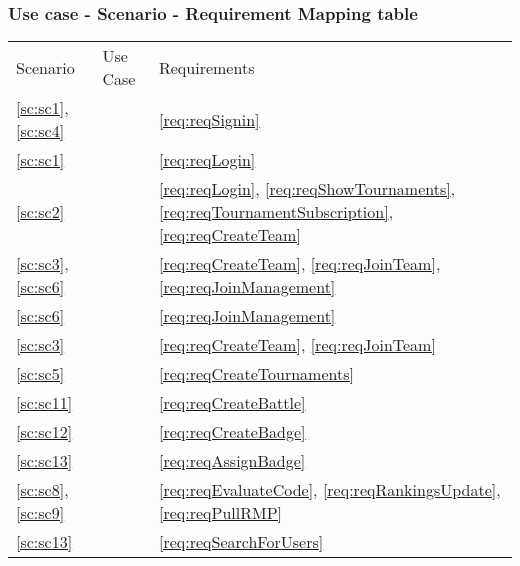 \subsubsection{Use case - Scenario - Requirement Mapping table}
\begin{center}
    \begin{tabu}{|X[.2]|X[.6]|X[.2]|} \hline \everyrow{\hline}
        Scenario & Use Case & Requirements \\
        \ref{sc:sc1}, \ref{sc:sc4} &  & \ref{req:reqSignin} \\
        \ref{sc:sc1} &  & \ref{req:reqLogin} \\
        \ref{sc:sc2} &  & \ref{req:reqLogin}, \ref{req:reqShowTournaments}, \ref{req:reqTournamentSubscription}, \ref{req:reqCreateTeam}\\
        \ref{sc:sc3}, \ref{sc:sc6} &  & \ref{req:reqCreateTeam}, \ref{req:reqJoinTeam}, \ref{req:reqJoinManagement} \\
        \ref{sc:sc6} &  & \ref{req:reqJoinManagement} \\
        \ref{sc:sc3} &  & \ref{req:reqCreateTeam}, \ref{req:reqJoinTeam} \\
        \ref{sc:sc5} &  & \ref{req:reqCreateTournaments} \\
        \ref{sc:sc11} &  & \ref{req:reqCreateBattle} \\
        \ref{sc:sc12} &  & \ref{req:reqCreateBadge} \\
        \ref{sc:sc13} &  & \ref{req:reqAssignBadge} \\
        \ref{sc:sc8}, \ref{sc:sc9} &  & \ref{req:reqEvaluateCode}, \ref{req:reqRankingsUpdate}, \ref{req:reqPullRMP} \\
        \ref{sc:sc13} &  & \ref{req:reqSearchForUsers} \\
    \end{tabu}
\end{center}